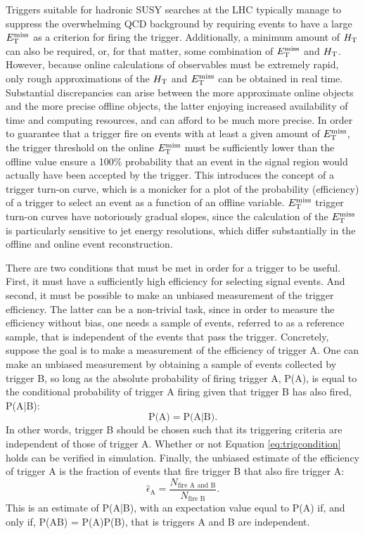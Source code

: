 \label{sec:hadronictrigger}
Triggers suitable for hadronic SUSY searches at the LHC typically manage to suppress the overwhelming QCD background by requiring events to have a large $E_{\text{T}}^{\rm miss}$ as a criterion for firing the trigger. Additionally, a minimum amount of $H_{\rm T}$ can also be required, or, for that matter, some combination of $E_{\text{T}}^{\rm miss}$ and $H_{\rm T}$. However, because   online calculations of observables must be extremely rapid, only rough approximations of the $H_{\rm T}$ and $E_{\text{T}}^{\rm miss}$ can be obtained in real time. Substantial discrepancies can arise between the more approximate online objects and the more precise offline objects, the latter enjoying increased availability of time and computing resources, and can afford to be much more precise. In order to guarantee that a trigger fire on events with at least a given amount of $E_{\text{T}}^{\rm miss}$, the trigger threshold on the online $E_{\text{T}}^{\rm miss}$ must be sufficiently lower than the offline value ensure a 100\% probability that an event in the signal region would actually have been accepted by the trigger. This introduces the concept of a trigger turn-on curve, which is a monicker for a plot of the probability (efficiency) of a trigger to select an event as a function of an offline variable. $E_{\text{T}}^{\rm miss}$ trigger turn-on curves have notoriously gradual slopes, since the calculation of the $E_{\text{T}}^{\rm miss}$ is particularly sensitive to jet energy resolutions, which differ substantially in the offline and online event reconstruction.

There are two conditions that must be met in order for a trigger to be useful. First, it must have a sufficiently high efficiency for selecting signal events. And second, it must be possible to make an unbiased measurement of the trigger efficiency. The latter can be a non-trivial task, since in order to measure the efficiency without bias, one needs a sample of events, referred to as a reference sample, that is independent of the events that pass the trigger. Concretely, suppose the goal is to make a measurement of the efficiency of trigger A. One can make an unbiased measurement by obtaining a sample of events collected by trigger B, so long as the absolute probability of firing trigger A, P(A), is equal to the conditional probability of trigger A firing given that trigger B has also fired, P(A$|$B):
\begin{equation}
\text{P(A)} = \text{P(A|B)}.
\label{eq:trigcondition}
\end{equation}
In other words, trigger B should be chosen such that its triggering criteria are independent of those of trigger A. Whether or not Equation \ref{eq:trigcondition} holds can be verified in simulation. Finally, the unbiased estimate of the efficiency of trigger A is the fraction of events that fire trigger B that also fire trigger A:
\begin{equation}
\hat{\epsilon}_{\text{A}} = \frac{N_{\text{fire A and B}}}{N_{\text{fire B}}}.
\label{eq:trigeff}
\end{equation}
This is an estimate of P(A|B), with an expectation value equal to P(A) if, and only if, P(AB) = P(A)P(B), that is triggers A and B are independent.

